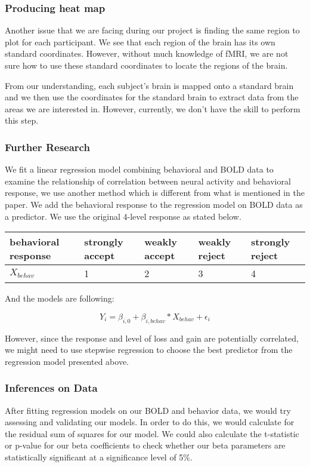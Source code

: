 \subsubsection{Producing heat map}
\indent \indent Another issue that we are facing during our project is finding the same region to plot for each participant. We see that each region of the brain has its own standard coordinates. However, without much knowledge of fMRI, we are not sure how to use these standard coordinates to locate the regions of the brain.

From our understanding, each subject's brain is mapped onto a standard brain and we then use the coordinates for the standard brain to extract data from the areas we are interested in. However, currently, we don't have the skill to perform this step.

\subsubsection{Further Research}

We fit a linear regression model combining behavioral and BOLD data to examine the relationship of correlation between neural activity and behavioral response, we use another method which is different from what is mentioned in the paper. We add the behavioral response to the regression model on BOLD data as a predictor. We use the original 4-level response as stated below. \\ 

\begin{tabular}{lllll}
\hline
behavioral response & strongly accept & weakly accept & weakly reject & strongly reject\\ 
\hline
$X_{behav}$ & 1 & 2 & 3 & 4 \\
\hline
\end{tabular}

And the models are following:

\begin{equation}
Y_{i} = \beta_{i, 0} + \beta_{i, behav} * X_{behav} + \epsilon_i
\end{equation}

However, since the response and level of loss and gain are potentially correlated, we might need to use stepwise regression to choose the best predictor from the regression model presented above.

\subsubsection{Inferences on Data}
\indent \indent After fitting regression models on our BOLD and behavior data, we would try assessing and validating our models. In order to do this, we would calculate for the residual sum of squares for our model. We could also calculate the t-statistic or p-value for our beta coefficients to check whether our beta parameters are statistically significant at a significance level of 5\%.
